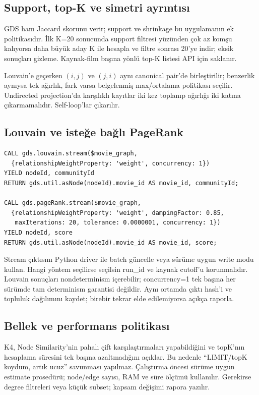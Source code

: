 \documentclass[11pt,a4paper]{article}
\begin{document}
\subsection{Support, top-K ve simetri ayrıntısı}
GDS ham Jaccard skorunu verir; support ve shrinkage bu uygulamanın ek politikasıdır. İlk K=20 sonucunda support filtresi yüzünden çok az komşu kalıyorsa daha büyük aday K ile hesapla ve filtre sonrası 20'ye indir; eksik sonuçları gizleme. Kaynak-film başına yönlü top-K listesi API için saklanır.

Louvain'e geçerken $(i,j)$ ve $(j,i)$ aynı canonical pair'de birleştirilir; benzerlik aynıysa tek ağırlık, fark varsa belgelenmiş max/ortalama politikası seçilir. Undirected projection'da karşılıklı kayıtlar iki kez toplanıp ağırlığı iki katına çıkarmamalıdır. Self-loop'lar çıkarılır.

\subsection{Louvain ve isteğe bağlı PageRank}
\begin{lstlisting}
CALL gds.louvain.stream($movie_graph,
  {relationshipWeightProperty: 'weight', concurrency: 1})
YIELD nodeId, communityId
RETURN gds.util.asNode(nodeId).movie_id AS movie_id, communityId;

CALL gds.pageRank.stream($movie_graph,
  {relationshipWeightProperty: 'weight', dampingFactor: 0.85,
   maxIterations: 20, tolerance: 0.0000001, concurrency: 1})
YIELD nodeId, score
RETURN gds.util.asNode(nodeId).movie_id AS movie_id, score;
\end{lstlisting}
Stream çıktısını Python driver ile batch güncelle veya sürüme uygun write modu kullan. Hangi yöntem seçilirse seçilsin run\_id ve kaynak cutoff'u korunmalıdır. Louvain sonuçları nondeterminism içerebilir; concurrency=1 tek başına her sürümde tam determinism garantisi değildir. Aynı ortamda çıktı hash'i ve topluluk dağılımını kaydet; birebir tekrar elde edilemiyorsa açıkça raporla.

\subsection{Bellek ve performans politikası}
K4, Node Similarity'nin pahalı çift karşılaştırmaları yapabildiğini ve topK'nın hesaplama süresini tek başına azaltmadığını açıklar. Bu nedenle ``LIMIT/topK koydum, artık ucuz'' savunması yapılmaz. Çalıştırma öncesi sürüme uygun estimate prosedürü; node/edge sayısı, RAM ve süre ölçümü kullanılır. Gerekirse degree filtreleri veya küçük subset; kapsam değişimi rapora yazılır.
\end{document}
